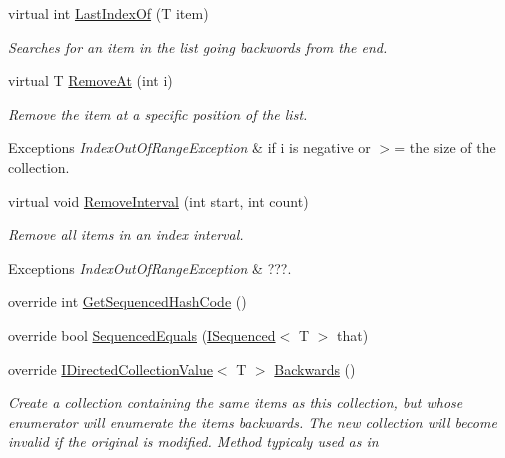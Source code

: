 \begin{DoxyCompactItemize}
virtual int \hyperlink{class_c5_1_1_linked_list_a0a4631db1f533e2561511edf9f4858b9}{Last\+Index\+Of} (T item)
\begin{DoxyCompactList}\small\item\em Searches for an item in the list going backwords from the end. \end{DoxyCompactList}\item 
virtual T \hyperlink{class_c5_1_1_linked_list_ad5bcb57accd6b97265cf8c12efeda71c}{Remove\+At} (int i)
\begin{DoxyCompactList}\small\item\em Remove the item at a specific position of the list. 
\begin{DoxyExceptions}{Exceptions}
{\em Index\+Out\+Of\+Range\+Exception} & if i is negative or $>$= the size of the collection. \\
\hline
\end{DoxyExceptions}
\end{DoxyCompactList}\item 
virtual void \hyperlink{class_c5_1_1_linked_list_a6deeac14ff0d6c8d9a498d8f609501a5}{Remove\+Interval} (int start, int count)
\begin{DoxyCompactList}\small\item\em Remove all items in an index interval. 
\begin{DoxyExceptions}{Exceptions}
{\em Index\+Out\+Of\+Range\+Exception} & ???. \\
\hline
\end{DoxyExceptions}
\end{DoxyCompactList}\item 
override int \hyperlink{class_c5_1_1_linked_list_a8318b5b0ea81fb23e601e8321699851a}{Get\+Sequenced\+Hash\+Code} ()
\item 
override bool \hyperlink{class_c5_1_1_linked_list_a3d2f19d9264bfc3076be39c03429a7aa}{Sequenced\+Equals} (\hyperlink{interface_c5_1_1_i_sequenced}{I\+Sequenced}$<$ T $>$ that)
\item 
override \hyperlink{interface_c5_1_1_i_directed_collection_value}{I\+Directed\+Collection\+Value}$<$ T $>$ \hyperlink{class_c5_1_1_linked_list_aa96b744c5e2f0db894b8c9ed9606c240}{Backwards} ()
\begin{DoxyCompactList}\small\item\em Create a collection containing the same items as this collection, but whose enumerator will enumerate the items backwards. The new collection will become invalid if the original is modified. Method typicaly used as in \end{DoxyCompactList}\item 

\end{DoxyCompactItemize}
